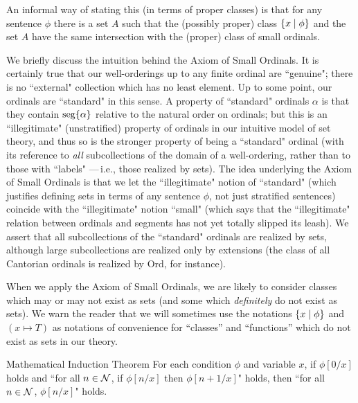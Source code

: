 An informal way of stating this (in terms of proper classes) is that
for any sentence $\phi$ there is a set $A$ such that the (possibly
proper) class $\{x \mid \phi\}$ and the set $A$ have the same
intersection with the (proper) class of small
ordinals. 

We briefly discuss the intuition behind the Axiom of Small Ordinals.
It is certainly true that our well-orderings up to any
finite ordinal are ``genuine"; there is no ``external"
collection which has no least element.  Up to some point, our
ordinals are ``standard" in this sense.  A property of
``standard" ordinals $\alpha$ is that they 
contain $\mathop{\mathrm{seg}}\{\alpha\}$ relative to the natural order on
ordinals; but this is an ``illegitimate" (unstratified)
property of ordinals in our intuitive model of set theory, and thus so is the
stronger property of being a ``standard" ordinal (with its reference to
{\itshape all\/} 
subcollections of the domain of a well-ordering, rather than to those
with ``labels" ---\,i.e., those realized by sets).  The idea underlying
the Axiom of Small Ordinals is that we let the
``illegitimate" notion of ``standard" (which justifies defining sets in terms
of any sentence $\phi$, not just stratified sentences)
coincide with the ``illegitimate" notion ``small" (which says that the
``illegitimate" relation between ordinals and segments has not
yet totally slipped its leash).  We assert that all subcollections of
the ``standard" ordinals are realized by sets, although large subcollections are
realized only by extensions (the class of all
Cantorian ordinals is realized by Ord, for instance).

When we apply the Axiom of Small Ordinals, we are likely to consider
classes which may or may not exist as sets (and some which {\itshape
definitely\/} do not exist as sets).  We warn the reader that we will
sometimes use the notations $\{x \mid \phi\}$ and $(x \mapsto T)$ as
notations of convenience for ``classes'' and ``functions'' which do not exist as sets in our theory.


\begin{Thm}{Mathematical Induction Theorem}
 For each condition $\phi$ and variable $x$,
 if $\phi[0/x]$ holds and ``for all $n \in {\cal N}$, if $\phi[n/x]$ then
 $\phi[n+1/x]$" holds, then ``for all $n \in {\cal N}$, $\phi[n/x]$" holds.
\end{Thm}

